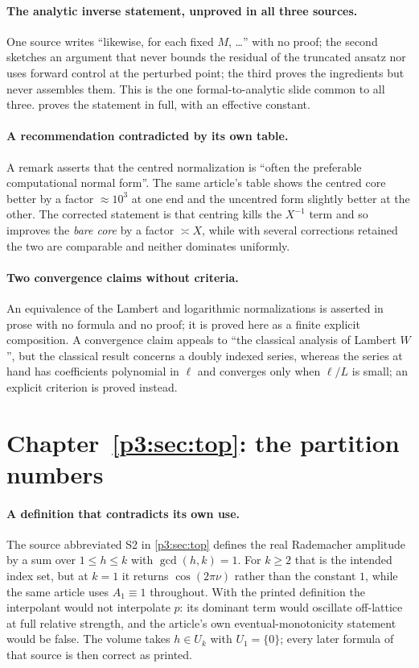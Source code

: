\documentclass[11pt,a4paper,oneside]{book}
\theoremstyle{plain}
\theoremstyle{definition}
\theoremstyle{remark}
\newcommand{\Wlam}{W}
\begin{document}
\paragraph{The analytic inverse statement, unproved in all three sources.}
One source writes ``likewise, for each fixed \(M\), \dots'' with no proof; the
second sketches an argument that never bounds the residual of the truncated
ansatz nor uses forward control at the perturbed point; the third proves the
ingredients but never assembles them.  This is the one formal-to-analytic
slide common to all three.   proves the
statement in full, with an effective constant.

\paragraph{A recommendation contradicted by its own table.}
A remark asserts that the centred normalization is ``often the preferable
computational normal form''.  The same article's table shows the centred core
better by a factor \(\approx10^{3}\) at one end and the uncentred form
slightly better at the other.  The corrected statement is that centring kills
the \(X^{-1}\) term and so improves the \emph{bare core} by a factor
\(\asymp X\), while with several corrections retained the two are comparable
and neither dominates uniformly.

\paragraph{Two convergence claims without criteria.}
An equivalence of the Lambert and logarithmic normalizations is asserted in
prose with no formula and no proof; it is proved here as a finite explicit
composition.  A convergence claim appeals to ``the classical analysis of
Lambert \(\Wlam\)'', but the classical result concerns a doubly indexed
series, whereas the series at hand has coefficients polynomial in
\(\ell\) and converges only when \(\ell/L\) is small; an explicit criterion is
proved instead.

\section{Chapter~\ref{p3:sec:top}: the partition numbers}

\paragraph{A definition that contradicts its own use.}
The source abbreviated \textsf{S2} in \cref{p3:sec:top} defines the real
Rademacher amplitude by a sum over \(1\le h\le k\) with \(\gcd(h,k)=1\).  For
\(k\ge2\) that is the intended index set, but at \(k=1\) it returns
\(\cos(2\pi\nu)\) rather than the constant \(1\), while the same article uses
\(A_1\equiv1\) throughout.  With the printed definition the interpolant would
not interpolate \(p\): its dominant term would oscillate off-lattice at full
relative strength, and the article's own eventual-monotonicity statement would
be false.  The volume takes \(h\in U_k\) with \(U_1=\{0\}\); every later
formula of that source is then correct as printed.
\end{document}
